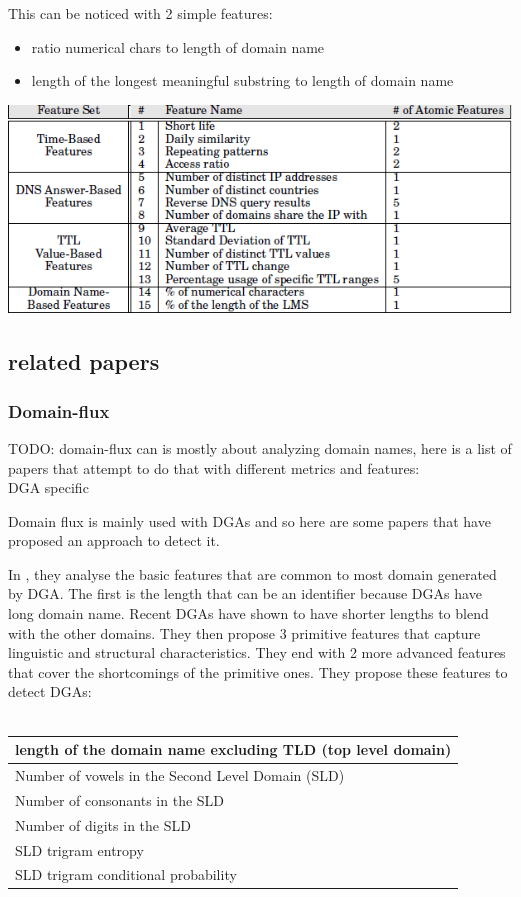 This can be noticed with 2 simple features:\\
\begin{itemize}[noitemsep]
\item ratio numerical chars to length of domain name
\item length of the longest meaningful substring to length of domain name
\end{itemize}
\includegraphics[scale=.3]{img/exposure_features.png}

\subsection{related papers}
\subsubsection{Domain-flux}
TODO: domain-flux can is mostly about analyzing domain names, here is a list of papers that attempt to do that with different metrics and features:  
\cite{dns-traffic}\\
DGA specific\\
\cite{phoenix}

Domain flux is mainly used with DGAs and so here are some papers that have proposed an approach to detect it.

In \cite{dga}, they analyse the basic features that are common to most domain generated by DGA. The first is the length that can be an identifier because DGAs have long domain name. Recent DGAs have shown to have shorter lengths to blend with the other domains. They then propose 3 primitive features that capture linguistic and structural characteristics. They end with 2 more advanced features that cover the shortcomings of the primitive ones. They propose these features to detect DGAs:\\\\
\begin{tabular}{|l|}
\hline
length of the domain name excluding TLD (top level domain)\\
\hline
Number of vowels in the Second Level Domain (SLD)\\
\hline
Number of consonants in the SLD\\
\hline
Number of digits in the SLD\\
\hline
SLD trigram entropy\\
\hline
SLD trigram conditional probability\\
\hline
\end{tabular}
\\


